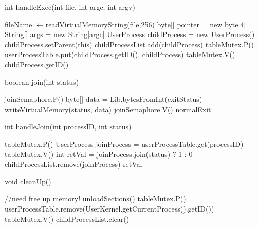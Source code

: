 \documentclass{article}
\renewcommand{\gets}{%
  \ensuremath{\leftarrow}}
\begin{document}
\begin{spacing}{1.1}
\begin{algorithm}
  \label{alg:handleExec}
  \caption{int \textsf{handleExec}(int file, int argc, int argv)}
  fileName\gets\textsf{readVirtualMemoryString}(file,256)\;
   {
    \;
  }
  byte[] pointer = new byte[4]\;
  String[] args = new String[argc]\;
  UserProcess childProcess = new UserProcess()\;
   {
    \;
  }
  childProcess.setParent(this)\;
  childProcessList.add(childProcess)\;
  \colorbox{myyellow}{tableMutex.P()}\;
  userProcessTable.put(childProcess.getID(), childProcess)\;
  \colorbox{myyellow}{tableMutex.V()}\;
  \Return childProcess.getID()\;
\end{algorithm}

\begin{algorithm}
  \label{alg:join}
  \caption{boolean \textsf{join}(int status)}
  joinSemaphore.P()\;
  byte[] data = Lib.bytesFromInt(exitStatus)\;
  writeVirtualMemory(status, data)\;
  joinSemaphore.V()\;
  \Return normalExit\;
\end{algorithm}

\begin{algorithm}
  \label{alg:handleJoin}
  \caption{int \textsf{handleJoin}(int processID, int status)}
  \colorbox{myyellow}{tableMutex.P()}\;
  UserProcess joinProcess = userProcessTable.get(processID)\;
  \colorbox{myyellow}{tableMutex.V()}\;
   {
    \;
  }
  int retVal = joinProcess.join(status) ? 1 : 0\;
  childProcessList.remove(joinProcess)\;
  \Return retVal\;
\end{algorithm}

\begin{algorithm}
\label{alg:cleanUp}
\caption{void \textsf{cleanUp}()}
    \colorbox{myyellow}{//need free up memory!}\;
    unloadSections()\;
    \colorbox{myyellow}{tableMutex.P()}\;
    userProcessTable.remove(UserKernel.getCurrentProcess().getID())\;
    \colorbox{myyellow}{tableMutex.V()}\;
    childProcessList.clear()\;
\end{algorithm}


\end{spacing}
\end{document}
